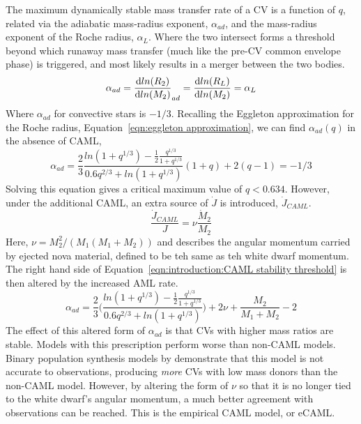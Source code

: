The maximum dynamically stable mass transfer rate of a CV is a function of $q$, related via the adiabatic mass-radius exponent, $\alpha_{ad}$, and the mass-radius exponent of the Roche radius, $\alpha_{L}$. Where the two intersect forms a threshold beyond which runaway mass transfer (much like the pre-CV common envelope phase) is triggered, and most likely results in a merger between the two bodies.
\begin{equation}
    \label{eqn:introduction:CAML stability threshold}
    \alpha_{ad} = \frac{{\rm d} ln(R_2)}{{\rm d} ln(M_2)}_{ad} = \frac{{\rm d} ln(R_L)}{{\rm d} ln(M_2)} = \alpha_L
\end{equation}
Where $\alpha_{ad}$ for convective stars is $-1/3$. Recalling the Eggleton approximation for the Roche radius, Equation~\ref{eqn:eggleton approximation}, we can find $\alpha_{ad}(q)$ \citep{Schreiber2016} in the absence of CAML,
\begin{equation}
    \alpha_{ad} = \frac{2}{3}\frac{ln(1+q^{1/3}) - \frac{1}{2}\frac{q^{1/3}}{1+q^{1/3}}}{0.6q^{2/3} + ln(1+q^{1/3})} (1 + q) + 2(q - 1) = -1/3
\end{equation}
Solving this equation gives a critical maximum value of $q < 0.634$. However, under the additional CAML, an extra source of $\dot J$ is introduced, $\dot J_{CAML}$.
\begin{equation}
    \frac{\dot J_{CAML}}{J} = \nu \frac{\dot M_2}{M_2}
\end{equation}
Here, $\nu = M_2^2 / (M_1(M_1 + M_2))$ and describes the angular momentum carried by ejected nova material, defined to be teh same as teh white dwarf momentum.
The right hand side of Equation~\ref{eqn:introduction:CAML stability threshold} is then altered by the increased AML rate.
\begin{equation}
    \alpha_{ad} = \frac{2}{3} \Bigg( \frac{ln(1+q^{1/3}) - \frac{1}{2}\frac{q^{1/3}}{1+q^{1/3}}}{0.6q^{2/3} + ln(1+q^{1/3})} \Bigg) + 2\nu + \frac{M_2}{M_1 + M_2} - 2
\end{equation}
The effect of this altered form of $\alpha_{ad}$ is that CVs with higher mass ratios are stable. Models with this prescription perform worse than non-CAML models. Binary population synthesis models by \citet{Schreiber2016} demonstrate that this model is not accurate to observations, producing {\it more} CVs with low mass donors than the non-CAML model. However, by altering the form of $\nu$ so that it is no longer tied to the white dwarf's angular momentum, a much better agreement with observations can be reached. This is the empirical CAML model, or eCAML.

